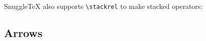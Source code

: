 \begin{rdemotable}
\rdemo{\pm}
\rdemo{\mp}
\rdemo{\times}
\rdemo{\div}
\rdemo{\ast}
\rdemo{\star}
\rdemo{\circ}
\rdemo{\bullet}
\rdemo{\cdot}
\rdemo{\cap}
\rdemo{\cup}
\rdemo{\uplus}
\rdemo{\sqcap}
\rdemo{\sqcup}
\rdemo{\vee}
\rdemo{\lor}
\rdemo{\wedge}
\rdemo{\land}
\rdemo{\setminus}
\rdemo{\wr}
\rdemo{\diamond}
\rdemo{\bigtriangleup}
\rdemo{\bigtriangledown}
\rdemo{\triangleleft}
\rdemo{\triangleright}
\rdemo{\oplus}
\rdemo{\ominus}
\rdemo{\otimes}
\rdemo{\oslash}
\rdemo{\odot}
\rdemo{\bigcirc}
\rdemo{\dagger}
\rdemo{\ddagger}
\rdemo{\amalg}
\rndemo{\leq}
\rndemo{\le}
\rndemo{\prec}
\rdemo{\preceq}
\rdemo{\ll}
\rndemo{\subset}
\rndemo{\subseteq}
\rdemo{\sqsubset}
\rndemo{\sqsubseteq}
\rndemo{\in}
\rndemo{\vdash}
\rndemo{\geq}
\rndemo{\ge}
\rndemo{\succ}
\rdemo{\succeq}
\rdemo{\gg}
\rndemo{\supset}
\rndemo{\supseteq}
\rdemo{\sqsupset}
\rndemo{\sqsupseteq}
\rndemo{\ni}
\rdemo{\dashv}
\rndemo{\equiv}
\rndemo{\sim}
\rndemo{\simeq}
\rdemo{\asymp}
\rndemo{\approx}
\rndemo{\cong}
\rdemo{\neq}
\rdemo{\doteq}
\rdemo{\notin}
\rdemo{\models}
\rdemo{\perp}
\rndemo{\mid}
\rdemo{\parallel}
\rdemo{\bowtie}
\rdemo{\smile}
\rdemo{\frown}
\rdemo{\propto}
\end{rdemotable}

SnuggleTeX also supports \verb|\stackrel| to make stacked operators:

\begin{demotable}
\end{demotable}

\subsection*{Arrows}

\begin{demotable}
\mdemo{\leftarrow}
\mdemo{\Leftarrow}
\mdemo{\rightarrow}
\mdemo{\Rightarrow}
\mdemo{\leftrightarrow}
\mdemo{\Leftrightarrow}
\mdemo{\mapsto}
\mdemo{\hookleftarrow}
\mdemo{\leftharpoonup}
\mdemo{\leftharpoondown}
\mdemo{\rightleftharpoons}
\mdemo{\longleftarrow}
\mdemo{\Longleftarrow}
\mdemo{\longrightarrow}
\mdemo{\Longrightarrow}
\mdemo{\longleftrightarrow}
\mdemo{\Longleftrightarrow}
\mdemo{\longmapsto}
\mdemo{\hookrightarrow}
\mdemo{\rightharpoonup}
\mdemo{\rightharpoondown}
\mdemo{\uparrow}
\mdemo{\Uparrow}
\mdemo{\downarrow}
\mdemo{\Downarrow}
\mdemo{\updownarrow}
\mdemo{\Updownarrow}
\mdemo{\nearrow}
\mdemo{\searrow}
\mdemo{\swarrow}
\mdemo{\nwarrow}
\end{demotable}

